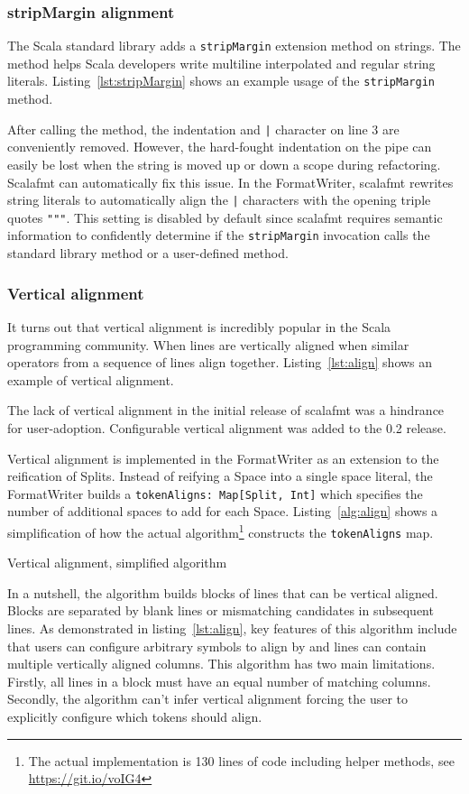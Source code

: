 \subsubsection{stripMargin alignment}
The Scala standard library adds a \texttt{stripMargin} extension method on strings.
The method helps Scala developers write multiline interpolated and regular string literals.
Listing~\ref{lst:stripMargin} shows an example usage of the \texttt{stripMargin} method.

After calling the method, the indentation and \texttt{|} character on line 3 are conveniently removed.
However, the hard-fought indentation on the pipe can easily be lost when the string is moved up or down a scope during refactoring.
Scalafmt can automatically fix this issue.
In the FormatWriter, scalafmt rewrites string literals to automatically align the \texttt{|} characters with the opening triple quotes \texttt{"""}.
This setting is disabled by default since scalafmt requires semantic information to confidently determine if the \texttt{stripMargin} invocation calls the standard library method or a user-defined method.

\subsubsection{Vertical alignment}
It turns out that vertical alignment is incredibly popular in the Scala programming community.
When lines are vertically aligned when similar operators from a sequence of lines align together.
Listing~\ref{lst:align} shows an example of vertical alignment.

The lack of vertical alignment in the initial release of scalafmt was a hindrance for user-adoption.
Configurable vertical alignment was added to the 0.2 release.

Vertical alignment is implemented in the FormatWriter as an extension to the reification of Splits.
Instead of reifying a Space into a single space literal,
the FormatWriter builds a \texttt{tokenAligns: Map[Split, Int]} which specifies the number of additional spaces to add for each Space.
Listing~\ref{alg:align} shows a simplification of how the actual algorithm\footnote{
  The actual implementation is 130 lines of code including helper methods, see
\href{https://git.io/voIG4}{https://git.io/voIG4}}
constructs the \texttt{tokenAligns} map.
\begin{algorithm}
  \caption{Vertical alignment, simplified algorithm}\label{alg:align}
  
\end{algorithm}
In a nutshell, the algorithm builds blocks of lines that can be vertical aligned.
Blocks are separated by blank lines or mismatching candidates in subsequent lines.
As demonstrated in listing~\ref{lst:align}, key features of this algorithm include that users can configure arbitrary symbols to align by and lines can contain multiple vertically aligned columns.
This algorithm has two main limitations.
Firstly, all lines in a block must have an equal number of matching columns.
Secondly, the algorithm can't infer vertical alignment forcing the user to explicitly configure which tokens should align.
